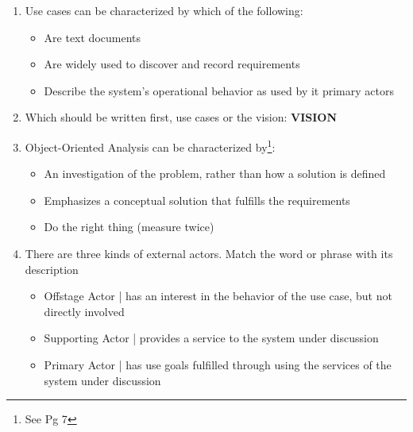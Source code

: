 \documentclass{article}
\begin{document}
\begin{enumerate}
\item Use cases can be characterized by which of the following:
\begin{itemize}
\item Are text documents
\item Are widely used to discover and record requirements
\item Describe the system's operational behavior as used by it primary actors
\end{itemize}

\item Which should be written first, use cases or the vision: \textbf{VISION}
\item Object-Oriented Analysis can be characterized by\footnote{See Pg 7}:

\begin{itemize}
\item An investigation of the problem, rather than how a solution is defined
\item Emphasizes a conceptual solution that fulfills the requirements
\item Do the right thing (measure twice)
\end{itemize}

\item There are three kinds of external actors. Match the word or phrase with its description
\begin{itemize}
\item Offstage Actor | has an interest in the behavior of the use case, but not directly involved
\item Supporting Actor | provides a service to the system under discussion
\item Primary Actor | has use goals fulfilled through using the services of the system under discussion
\end{itemize}


\end{enumerate}
\end{document}
